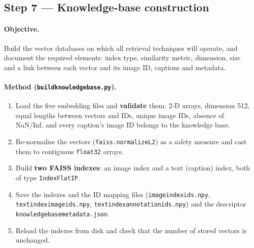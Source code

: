 \documentclass[11pt,a4paper]{article}
\renewcommand{\_}{\textunderscore\allowbreak{}}
\newcommand{\code}[1]{\texttt{#1}}
\begin{document}

\subsection{Step 7 --- Knowledge-base construction}
\label{sec:kb}

\paragraph{Objective.} Build the vector databases on which all retrieval techniques will operate, and document the required elements: index type, similarity metric, dimension, size and a link between each vector and its image ID, captions and metadata.

\paragraph{Method (\code{build\_knowledge\_base.py}).}
\begin{enumerate}[nosep]
  \item Load the five embedding files and \textbf{validate} them: 2-D arrays, dimension 512, equal lengths between vectors and IDs, unique image IDs, absence of NaN/Inf, and every caption's image ID belongs to the knowledge base.
  \item Re-normalise the vectors (\code{faiss.normalize\_L2}) as a safety measure and cast them to contiguous \code{float32} arrays.
  \item Build \textbf{two FAISS indexes}: an image index and a text (caption) index, both of type \code{IndexFlatIP}.
  \item \raggedright Save the indexes and the ID mapping files (\code{image\_index\_ids.npy}, \code{text\_index\_image\_ids.npy}, \code{text\_index\_annotation\_ids.npy}) and the descriptor \code{knowledge\_base\_metadata.json}.
  \item Reload the indexes from disk and check that the number of stored vectors is unchanged.
\end{enumerate}
\end{document}
